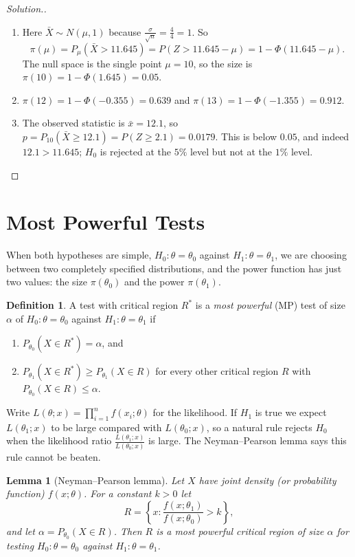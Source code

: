 \documentclass[12pt,a4paper]{report}
\theoremstyle{definition}
\newtheorem{definition}[thm]{Definition}
\theoremstyle{plain}
\newtheorem{lem}[thm]{Lemma}
\newenvironment{solution}
  {\renewcommand{\qedsymbol}{}\begin{proof}[\textit{Solution}.]}
  {\end{proof}}
\begin{document}
\begin{solution}
\begin{enumerate}
\item[(a)] Here $\bar X\sim N(\mu,1)$ because $\frac{\sigma}{\sqrt n} =
\frac{4}{4} = 1$. So
\[\pi(\mu) = P_\mu(\bar X>11.645) = P(Z>11.645 - \mu) = 1 - \Phi(11.645 - \mu).\]
The null space is the single point $\mu = 10$, so the size is
$\pi(10) = 1 - \Phi(1.645) = 0.05$.
\item[(b)] $\pi(12) = 1 - \Phi(-0.355) = 0.639$ and
$\pi(13) = 1 - \Phi(-1.355) = 0.912$.
\item[(c)] The observed statistic is $\bar x = 12.1$, so
$p = P_{10}(\bar X\ge 12.1) = P(Z\ge 2.1) = 0.0179$. This is below $0.05$, and
indeed $12.1>11.645$; $H_0$ is rejected at the $5\%$ level but not at the $1\%$
level.
\end{enumerate}
\end{solution}

\section{Most Powerful Tests}

When both hypotheses are simple, $H_0\colon\theta=\theta_0$ against
$H_1\colon\theta=\theta_1$, we are choosing between two completely specified
distributions, and the power function has just two values: the size
$\pi(\theta_0)$ and the power $\pi(\theta_1)$.

\begin{definition}
\label{def:mp}
A test with critical region $R^*$ is a \emph{most powerful} (MP) test of size
$\alpha$ of $H_0\colon\theta=\theta_0$ against $H_1\colon\theta=\theta_1$ if
\begin{enumerate}
\item[(i)] $P_{\theta_0}(X\in R^*) = \alpha$, and
\item[(ii)] $P_{\theta_1}(X\in R^*)\ge P_{\theta_1}(X\in R)$ for every other
critical region $R$ with $P_{\theta_0}(X\in R)\le\alpha$.
\end{enumerate}
\end{definition}

Write $L(\theta;x) = \prod_{i=1}^n f(x_i;\theta)$ for the likelihood. If $H_1$ is
true we expect $L(\theta_1;x)$ to be large compared with $L(\theta_0;x)$, so a
natural rule rejects $H_0$ when the likelihood ratio
$\frac{L(\theta_1;x)}{L(\theta_0;x)}$ is large. The Neyman--Pearson lemma says this
rule cannot be beaten.

\begin{lem}[Neyman--Pearson lemma]
\label{lem:np}
Let $X$ have joint density (or probability function) $f(x;\theta)$. For a
constant $k>0$ let
\[R = \left\{x : \frac{f(x;\theta_1)}{f(x;\theta_0)}>k\right\} ,\]
and let $\alpha = P_{\theta_0}(X\in R)$. Then $R$ is a most powerful critical
region of size $\alpha$ for testing $H_0\colon\theta=\theta_0$ against
$H_1\colon\theta=\theta_1$.
\end{lem}
\end{document}
